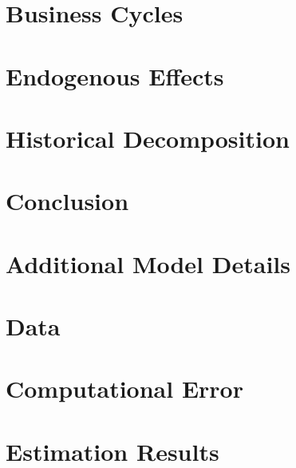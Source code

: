 \documentclass[11pt]{article}
\numberwithin{equation}{section} %
\numberwithin{figure}{section} %
\numberwithin{table}{section} %
\begin{document}
\section{Business Cycles} \label{sec:buis-cycs}


\section{Endogenous Effects} \label{sec:endog-eff}


\section{Historical Decomposition} \label{sec:hist-decomp}


\section{Conclusion} \label{sec:conc}



\newpage
\printbibliography
\FloatBarrier


\newpage
\appendix

\section{Additional Model Details} \label{app:mod}

\FloatBarrier

\section{Data} \label{app:data}

\FloatBarrier

\section{Computational Error} \label{app:comp}

\FloatBarrier

\section{Estimation Results} \label{app:bayes}

\FloatBarrier
\end{document}
